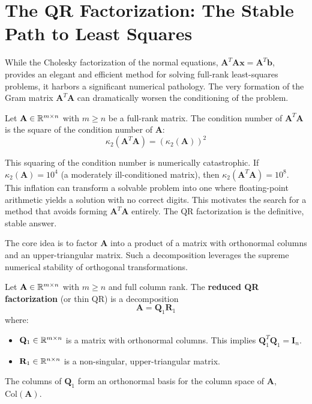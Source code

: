 \newpage
\section{The QR Factorization: The Stable Path to Least Squares}

While the Cholesky factorization of the normal equations, $\mathbf{A}^T\mathbf{A}\mathbf{x} = \mathbf{A}^T\mathbf{b}$, provides an elegant and efficient method for solving full-rank least-squares problems, it harbors a significant numerical pathology. The very formation of the Gram matrix $\mathbf{A}^T\mathbf{A}$ can dramatically worsen the conditioning of the problem.

\begin{theorem}
Let $\mathbf{A} \in \mathbb{R}^{m \times n}$ with $m \ge n$ be a full-rank matrix. The condition number of $\mathbf{A}^T\mathbf{A}$ is the square of the condition number of $\mathbf{A}$:
\[ \kappa_2(\mathbf{A}^T\mathbf{A}) = (\kappa_2(\mathbf{A}))^2 \]
\end{theorem}
\begin{remark}
This squaring of the condition number is numerically catastrophic. If $\kappa_2(\mathbf{A}) = 10^4$ (a moderately ill-conditioned matrix), then $\kappa_2(\mathbf{A}^T\mathbf{A}) = 10^8$. This inflation can transform a solvable problem into one where floating-point arithmetic yields a solution with no correct digits. This motivates the search for a method that avoids forming $\mathbf{A}^T\mathbf{A}$ entirely. The QR factorization is the definitive, stable answer.
\end{remark}

The core idea is to factor $\mathbf{A}$ into a product of a matrix with orthonormal columns and an upper-triangular matrix. Such a decomposition leverages the supreme numerical stability of orthogonal transformations.

\begin{definition}
Let $\mathbf{A} \in \mathbb{R}^{m \times n}$ with $m \ge n$ and full column rank. The \textbf{reduced QR factorization} (or thin QR) is a decomposition
\[ \mathbf{A} = \mathbf{Q}_1\mathbf{R}_1 \]
where:
\begin{itemize}
    \item $\mathbf{Q}_1 \in \mathbb{R}^{m \times n}$ is a matrix with orthonormal columns. This implies $\mathbf{Q}_1^T\mathbf{Q}_1 = \mathbf{I}_n$.
    \item $\mathbf{R}_1 \in \mathbb{R}^{n \times n}$ is a non-singular, upper-triangular matrix.
\end{itemize}
The columns of $\mathbf{Q}_1$ form an orthonormal basis for the column space of $\mathbf{A}$, $\text{Col}(\mathbf{A})$.
\end{definition}

